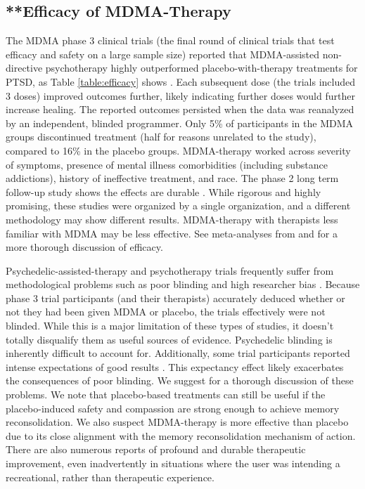 \documentclass[12pt,letterpaper]{article}
\begin{document}
\subsection{**Efficacy of MDMA-Therapy}
The MDMA phase 3 clinical trials (the final round of clinical trials that test efficacy and safety on a large sample size) reported that MDMA-assisted non-directive psychotherapy highly outperformed placebo-with-therapy treatments for PTSD, as Table \ref{table:efficacy} shows \cite{mitchellMDMAClinicalTrial,mitchellMDMAClinicalTrial2}. Each subsequent dose (the trials included 3 doses) improved outcomes further, likely indicating further doses would further increase healing. The reported outcomes persisted when the data was reanalyzed by an independent, blinded programmer. Only 5\% of participants in the MDMA groups discontinued treatment (half for reasons unrelated to the study), compared to 16\% in the placebo groups. MDMA-therapy worked across severity of symptoms, presence of mental illness comorbidities (including substance addictions), history of ineffective treatment, and race. The phase 2 long term follow-up study shows the effects are durable \cite{jeromeMDMALongTerm}. While rigorous and highly promising, these studies were organized by a single organization, and a different methodology may show different results. MDMA-therapy with therapists less familiar with MDMA may be less effective. See meta-analyses from \textcite{greenMeta} and \textcite{smithSystematic} for a more thorough discussion of efficacy.

Psychedelic-assisted-therapy and psychotherapy trials frequently suffer from methodological problems such as poor blinding and high researcher bias \cite{adayMethodologicalRigor}. Because phase 3 trial participants (and their therapists) accurately deduced whether or not they had been given MDMA or placebo, the trials effectively were not blinded. While this is a major limitation of these types of studies, it doesn't totally disqualify them as useful sources of evidence. Psychedelic blinding is inherently difficult to account for. Additionally, some trial participants reported intense expectations of good results \cite{powerTrip}. This expectancy effect likely exacerbates the consequences of poor blinding. We suggest \textcite{vanElkMethodology} for a thorough discussion of these problems. We note that placebo-based treatments can still be useful if the placebo-induced safety and compassion are strong enough to achieve memory reconsolidation. We also suspect MDMA-therapy is more effective than placebo due to its close alignment with the memory reconsolidation mechanism of action. There are also numerous reports of profound and durable therapeutic improvement, even inadvertently in situations where the user was intending a recreational, rather than therapeutic experience.
\end{document}
